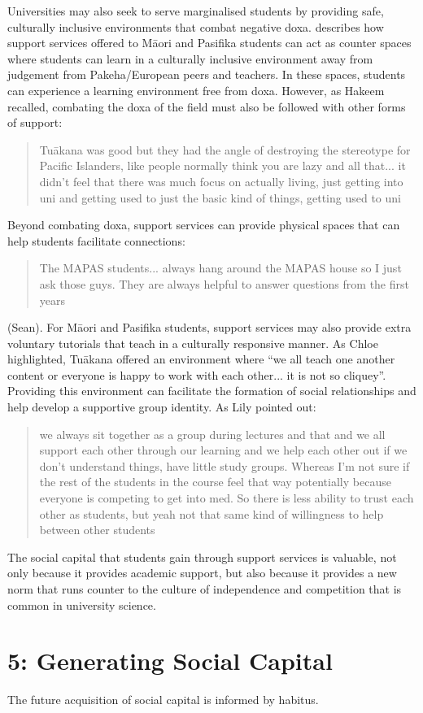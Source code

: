 Universities may also seek to serve marginalised students by providing safe, culturally inclusive environments that combat negative doxa. \cite{mayeda2014you} describes how support services offered to M\={a}ori and Pasifika students can act as counter spaces where students can learn in a culturally inclusive environment away from judgement from Pakeha/European peers and teachers. In these spaces, students can experience a learning environment free from doxa. However, as Hakeem recalled, combating the doxa of the field must also be followed with other forms of support: \blockquote{Tu\={a}kana was good but they had the angle of destroying the stereotype for Pacific Islanders, like people normally think you are lazy and all that... it didn't feel that there was much focus on actually living, just getting into uni and getting used to just the basic kind of things, getting used to uni} Beyond combating doxa, support services can provide physical spaces that can help students facilitate connections: \blockquote{The MAPAS students... always hang around the MAPAS house so I just ask those guys. They are always helpful to answer questions from the first years} (Sean). For M\={a}ori and Pasifika students, support services may also provide extra voluntary tutorials that teach in a culturally responsive manner. As Chloe highlighted, Tu\={a}kana offered an environment where ``we all teach one another content or everyone is happy to work with each other...  it is not so cliquey''. Providing this environment can facilitate the formation of social relationships and help develop a supportive group identity. As Lily pointed out: \blockquote{we always sit together as a group during lectures and that and we all support each other through our learning and we help each other out if we don’t understand things, have little study groups. Whereas I’m not sure if the rest of the students in the course feel that way potentially because everyone is competing to get into med. So there is less ability to trust each other as students, but yeah not that same kind of willingness to help between other students}. The social capital that students gain through support services is valuable, not only because it provides academic support, but also because it provides a new norm that runs counter to the culture of independence and competition that is common in university science.

\section{5: Generating Social Capital}
The future acquisition of social capital is informed by habitus.

